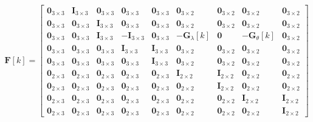 \documentclass[UTF8,11pt,a4paper]{ctexart}
\begin{document}
\[
\mathbf{F}[k] = \begin{bmatrix}
\mathbf{0}_{3\times3} & \mathbf{I}_{3\times3} & \mathbf{0}_{3\times3} & \mathbf{0}_{3\times3} & \mathbf{0}_{3\times3} & \mathbf{0}_{3\times2} & \mathbf{0}_{3\times2} & \mathbf{0}_{3\times2} & \mathbf{0}_{3\times2}\\
\mathbf{0}_{3\times3} & \mathbf{0}_{3\times3} & \mathbf{I}_{3\times3} & \mathbf{0}_{3\times3} & \mathbf{0}_{3\times3} & \mathbf{0}_{3\times2} & \mathbf{0}_{3\times2} & \mathbf{0}_{3\times2} & \mathbf{0}_{3\times2}\\
\mathbf{0}_{3\times3} & \mathbf{0}_{3\times3} & \mathbf{I}_{3\times3} & -\mathbf{I}_{3\times3} & \mathbf{0}_{3\times3} & -\mathbf{G}_{\lambda}[k] & \mathbf{0} & -\mathbf{G}_{\theta}[k] & \mathbf{0}_{3\times2}\\
\mathbf{0}_{3\times3} & \mathbf{0}_{3\times3} & \mathbf{0}_{3\times3} & \mathbf{I}_{3\times3} & \mathbf{I}_{3\times3} & \mathbf{0}_{3\times2} & \mathbf{0}_{3\times2} & \mathbf{0}_{3\times2} & \mathbf{0}_{3\times2}\\
\mathbf{0}_{3\times3} & \mathbf{0}_{3\times3} & \mathbf{0}_{3\times3} & \mathbf{0}_{3\times3} & \mathbf{I}_{3\times3} & \mathbf{0}_{3\times2} & \mathbf{0}_{3\times2} & \mathbf{0}_{3\times2} & \mathbf{0}_{3\times2}\\
\mathbf{0}_{2\times3} & \mathbf{0}_{2\times3} & \mathbf{0}_{2\times3} & \mathbf{0}_{2\times3} & \mathbf{0}_{2\times3} & \mathbf{I}_{2\times2} & \mathbf{I}_{2\times2} & \mathbf{0}_{2\times2} & \mathbf{0}_{2\times2}\\
\mathbf{0}_{2\times3} & \mathbf{0}_{2\times3} & \mathbf{0}_{2\times3} & \mathbf{0}_{2\times3} & \mathbf{0}_{2\times3} & \mathbf{0}_{2\times2} & \mathbf{I}_{2\times2} & \mathbf{0}_{2\times2} & \mathbf{0}_{2\times2}\\
\mathbf{0}_{2\times3} & \mathbf{0}_{2\times3} & \mathbf{0}_{2\times3} & \mathbf{0}_{2\times3} & \mathbf{0}_{2\times3} & \mathbf{0}_{2\times2} & \mathbf{0}_{2\times2} & \mathbf{I}_{2\times2} & \mathbf{I}_{2\times2}\\
\mathbf{0}_{2\times3} & \mathbf{0}_{2\times3} & \mathbf{0}_{2\times3} & \mathbf{0}_{2\times3} & \mathbf{0}_{2\times3} & \mathbf{0}_{2\times2} & \mathbf{0}_{2\times2} & \mathbf{0}_{2\times2} & \mathbf{I}_{2\times2}
\end{bmatrix}
\]
\end{document}
